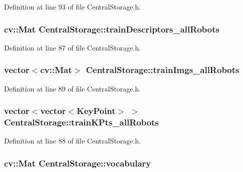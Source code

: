 \-Definition at line 93 of file \-Central\-Storage.\-h.

\hypertarget{classCentralStorage_ad574732df5058d95d650c1187a9ba4f6}{
\subsubsection[{train\-Descriptors\-\_\-all\-Robots}]{\setlength{\rightskip}{0pt plus 5cm}cv\-::\-Mat {\bf \-Central\-Storage\-::train\-Descriptors\-\_\-all\-Robots}}}\label{classCentralStorage_ad574732df5058d95d650c1187a9ba4f6}


\-Definition at line 87 of file \-Central\-Storage.\-h.

\hypertarget{classCentralStorage_a673208fa43bab02c4e53077ae45a38e7}{
\subsubsection[{train\-Imgs\-\_\-all\-Robots}]{\setlength{\rightskip}{0pt plus 5cm}vector$<$cv\-::\-Mat$>$ {\bf \-Central\-Storage\-::train\-Imgs\-\_\-all\-Robots}}}\label{classCentralStorage_a673208fa43bab02c4e53077ae45a38e7}


\-Definition at line 89 of file \-Central\-Storage.\-h.

\hypertarget{classCentralStorage_a6eba28072f558f36c2b3a08170f9db74}{
\subsubsection[{train\-K\-Pts\-\_\-all\-Robots}]{\setlength{\rightskip}{0pt plus 5cm}vector$<$vector$<$\-Key\-Point$>$ $>$ {\bf \-Central\-Storage\-::train\-K\-Pts\-\_\-all\-Robots}}}\label{classCentralStorage_a6eba28072f558f36c2b3a08170f9db74}


\-Definition at line 88 of file \-Central\-Storage.\-h.

\hypertarget{classCentralStorage_a50f04d43d8c1f26725bb2e2e560a494c}{
\subsubsection[{vocabulary}]{\setlength{\rightskip}{0pt plus 5cm}cv\-::\-Mat {\bf \-Central\-Storage\-::vocabulary}}}\label{classCentralStorage_a50f04d43d8c1f26725bb2e2e560a494c}


